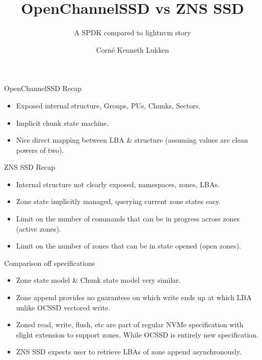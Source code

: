 \documentclass{beamer}
\author{Corné Kenneth Lukken}
\title{OpenChannelSSD vs ZNS SSD}
\subtitle{A SPDK compared to lightnvm story}
\begin{document}

\frame{\titlepage}



\begin{frame}{OpenChannelSSD Recap}
	\begingroup
	\small
		\begin{itemize}
			\item Exposed internal structure, Groups, PUs, Chunks, Sectors.
			\item Implicit chunk state machine.
			\item Nice direct mapping between LBA \& structure
				  (assuming values are clean powers of two).
		\end{itemize}
	\endgroup
\end{frame}

\begin{frame}{ZNS SSD Recap}
	\begingroup
	\small
		\begin{itemize}
			\item Internal structure not clearly exposed, namespaces, zones, LBAs.
			\item Zone state implicitly managed, querying current zone states easy.
			\item Limit on the number of commands that can be in
				  progress across zones (active zones).
			\item Limit on the number of zones that can be in state
				  opened (open zones).
		\end{itemize}
	\endgroup
\end{frame}

\begin{frame}{Comparison off specifications}
	\begingroup
	\small
	\begin{itemize}
		\item Zone state model \& Chunk state model very similar.
		\item Zone append provides no guarantees on which write ends up at
			  which LBA unlike OCSSD vectored write.
		\item Zoned read, write, flush, etc are part of regular NVMe
			  specification with slight extension to support zones. While OCSSD
			  is entirely new specification.
		\item ZNS SSD expects user to retrieve LBAs of zone append
			  asynchronously.
	\end{itemize}
	\endgroup
\end{frame}
\end{document}
